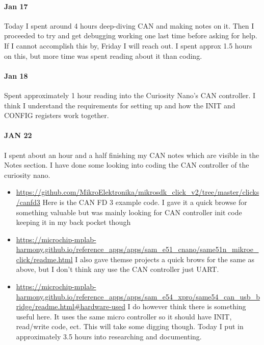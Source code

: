 \documentclass{article}
\begin{document}
\paragraph{Jan 17}
Today I spent around 4 hours deep-diving CAN and making notes on it. Then I proceeded to try and get debugging working one last time before asking for help. If I cannot accomplish this by, Friday I will reach out. I spent approx 1.5 hours on this, but more time was spent reading about it than coding. 

\paragraph{Jan 18}
Spent approximately 1 hour reading into the Curiosity Nano's CAN controller. I think I understand the requirements for setting up and how the INIT and CONFIG registers work together. 
\paragraph{JAN 22}
I spent about an hour and a half finishing my CAN notes which are visible in the Notes section. I have done some looking into coding the CAN controller of the curiosity nano. 
\begin{itemize}
    \item \url{https://github.com/MikroElektronika/mikrosdk_click_v2/tree/master/clicks/canfd3} Here is the CAN FD 3 example code. I gave it a quick browse for something valuable but was mainly looking for CAN controller init code keeping it in my back pocket  though
    \item \url{https://microchip-mplab-harmony.github.io/reference_apps/apps/sam_e51_cnano/same51n_mikroe_click/readme.html} I also gave themse projects a quick brows for the same as above, but I don't think any use the CAN controller just UART. 
    \item \url{https://microchip-mplab-harmony.github.io/reference_apps/apps/sam_e54_xpro/same54_can_usb_bridge/readme.html#hardware-used} I do however think there is something useful here. It uses the same micro controller so it should have INIT, read/write code, ect. This will take some digging though. 
    Today I put in approximately 3.5 hours into researching and documenting. 
\end{itemize}
\end{document}
